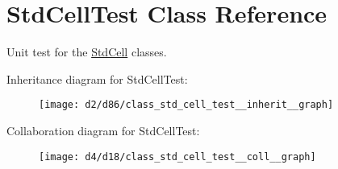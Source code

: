 \hypertarget{class_std_cell_test}{}\section{Std\+Cell\+Test Class Reference}
\label{class_std_cell_test}


Unit test for the \hyperlink{class_std_cell}{Std\+Cell} classes.  




Inheritance diagram for Std\+Cell\+Test\+:
\nopagebreak
\begin{figure}[H]
\begin{center}
\leavevmode
\texttt{[image: d2/d86/class\_std\_cell\_test\_\_inherit\_\_graph]}
\end{center}
\end{figure}


Collaboration diagram for Std\+Cell\+Test\+:
\nopagebreak
\begin{figure}[H]
\begin{center}
\leavevmode
\texttt{[image: d4/d18/class\_std\_cell\_test\_\_coll\_\_graph]}
\end{center}
\end{figure}
